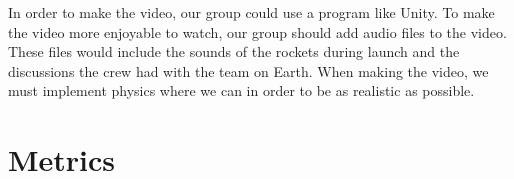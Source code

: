 \documentclass[onecolumn, draftclsnofoot,10pt, compsoc]{IEEEtran}
\begin{document}
In order to make the video, our group could use a program like Unity. To make the video more enjoyable to watch, our group should add audio files to the video. These files would include the sounds of the rockets during launch and the discussions the crew had with the team on Earth. When making the video, we must implement physics where we can in order to be as realistic as possible.


\section{Metrics}
\end{document}
